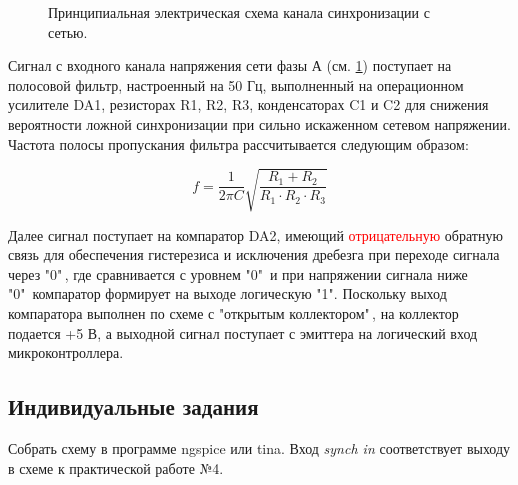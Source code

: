 \begin{figure}[!ht]
\begin{circuitikz}[scale=0.9]
\end{circuitikz}
	\caption{Принципиальная электрическая схема канала синхронизации с сетью.}
	\label{Synch}
\end{figure}

Сигнал с входного канала напряжения сети фазы А (см. \ref{Synch}) поступает на полосовой фильтр, настроенный на 50 Гц, 
выполненный на операционном усилителе DA1, резисторах R1, R2, R3, конденсаторах C1 и C2 для снижения вероятности ложной синхронизации 
при сильно искаженном сетевом напряжении. Частота полосы пропускания фильтра рассчитывается следующим образом:

\begin{equation}
	f = \frac{1}{2\pi C} \sqrt{\frac{R_1+R_2}{R_1\cdot R_2 \cdot R_3}}
\label{f}
\end{equation}

 Далее сигнал поступает на компаратор DA2, имеющий \textcolor{red}{отрицательную} обратную связь для обеспечения гистерезиса и исключения дребезга 
 при переходе сигнала через "$0$"\,, где сравнивается с уровнем "0"\  и при напряжении сигнала ниже "0"\  компаратор формирует на выходе логическую "1". 
 Поскольку выход компаратора выполнен по схеме с "открытым коллектором"\,, на коллектор подается +5 В, 
 а выходной сигнал поступает с эмиттера на логический вход микроконтроллера.

\subsection{Индивидуальные задания}

Собрать схему в программе ngspice или tina. Вход {\it synch in} соответствует выходу в схеме к практической работе №4. 

